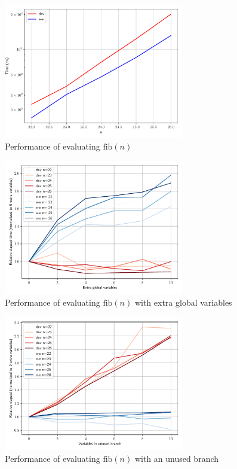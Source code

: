 \begin{figure}
  \centering
  \includegraphics[width=0.7\textwidth]{img/perf_fib.pdf}
  \caption{Performance of evaluating $\text{fib}(n)$}
  \label{fig:perf-fib-graph}
\end{figure}

\begin{figure}
  \centering
  \includegraphics[width=0.7\textwidth]{img/perf_fib_more_vars.pdf}
  \caption{Performance of evaluating $\text{fib}(n)$ with extra global variables}
  \label{fig:perf-fib-more-vars-graph}
\end{figure}

\begin{figure}
  \centering
  \includegraphics[width=0.7\textwidth]{img/perf_fib_more_branches.pdf}
  \caption{Performance of evaluating $\text{fib}(n)$ with an unused branch}
  \label{fig:perf-fib-more-branches-graph}
\end{figure}



